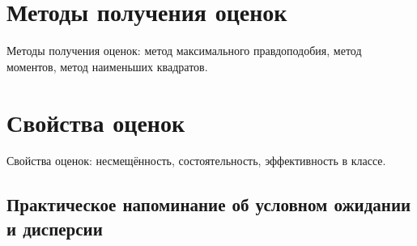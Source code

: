 \documentclass[12pt]{article}
\begin{document}

\tableofcontents{}



\section{Методы получения оценок}

Методы получения оценок: метод максимального правдоподобия, метод моментов, метод наименьших квадратов.


\section{Свойства оценок}
Свойства оценок: несмещённость, состоятельность, эффективность в классе.

\subsection{Практическое напоминание об условном ожидании и дисперсии}
\end{document}
